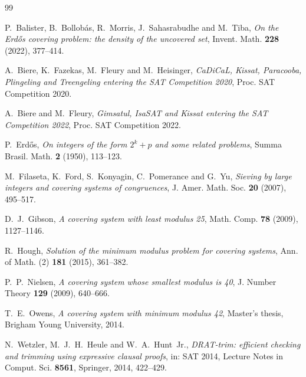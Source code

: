 \documentclass[11pt]{amsart}
\theoremstyle{definition}
\theoremstyle{remark}
\begin{document}
\begin{thebibliography}{99}

 P.~Balister, B.~Bollobás, R.~Morris, J.~Sahasrabudhe and M.~Tiba, \emph{On the Erdős covering
problem: the density of the uncovered set}, Invent. Math. \textbf{228} (2022), 377--414.

 A.~Biere, K.~Fazekas, M.~Fleury and M.~Heisinger, \emph{CaDiCaL, Kissat, Paracooba, Plingeling and
Treengeling entering the SAT Competition 2020}, Proc. SAT Competition 2020.

 A.~Biere and M.~Fleury, \emph{Gimsatul, IsaSAT and Kissat entering the SAT Competition 2022}, Proc.
SAT Competition 2022.

 P.~Erdős, \emph{On integers of the form $2^k+p$ and some related problems}, Summa Brasil. Math.
\textbf{2} (1950), 113--123.

 M.~Filaseta, K.~Ford, S.~Konyagin, C.~Pomerance and G.~Yu, \emph{Sieving by large integers and
covering systems of congruences}, J. Amer. Math. Soc. \textbf{20} (2007), 495--517.

 D.~J.~Gibson, \emph{A covering system with least modulus 25}, Math. Comp. \textbf{78} (2009),
1127--1146.

 R.~Hough, \emph{Solution of the minimum modulus problem for covering systems}, Ann. of Math. (2)
\textbf{181} (2015), 361--382.

 P.~P.~Nielsen, \emph{A covering system whose smallest modulus is 40}, J. Number Theory
\textbf{129} (2009), 640--666.

 T.~E.~Owens, \emph{A covering system with minimum modulus 42}, Master's thesis, Brigham Young
University, 2014.

 N.~Wetzler, M.~J.~H.~Heule and W.~A.~Hunt~Jr., \emph{DRAT-trim: efficient checking and trimming
using expressive clausal proofs}, in: SAT 2014, Lecture Notes in Comput. Sci. \textbf{8561}, Springer, 2014,
422--429.

\end{thebibliography}
\end{document}
